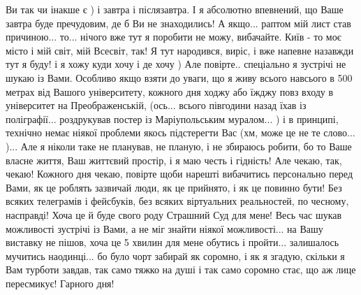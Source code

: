  
 
 
 
 

Ви так чи інакше є ) і завтра і післязавтра. І я абсолютно впевнений, що Ваше
завтра буде пречудовим, де б Ви не знаходились! А якщо... раптом мій лист став
причиною... то... нічого вже тут я поробити не можу, вибачайте. Київ - то моє
місто і мій світ, мій Всесвіт, так! Я тут народився, виріс, і вже напевне
назавжди тут я буду! і я хожу куди хочу і де хочу ) Але повірте.. спеціально я
зустрічі не шукаю із Вами. Особливо якщо взяти до уваги, що я живу всього
навсього в 500 метрах від Вашого університету, кожного дня ходжу або їжджу повз
входу в університет на Преображенській, (ось... всього півгодини назад їхав із
поліграфії... роздрукував постер із Маріупольським муралом... ) і в принципі,
технічно немає ніякої проблеми якось підстерегти Вас (хм, може це не те
слово... )... Але я ніколи таке не планував, не планую, і не збираюсь робити,
бо то Ваше власне життя, Ваш життєвий простір, і я маю честь і гідність!  Але
чекаю, так, чекаю! Кожного дня чекаю, повірте щоби нарешті вибачитись
персонально  перед Вами, як це роблять зазвичай люди, як це прийнято, і як це
повинно бути! Без всяких телеграмів і фейсбуків, без всяких віртуальних
реальностей, по чесному, насправді! Хоча це й буде свого роду Страшний Суд для
мене! Весь час шукав можливості зустрічі із Вами, а не міг знайти ніякої
можливості... на Вашу виставку не пішов, хоча це 5 хвилин для мене обутись і
пройти... залишалось мучитись наодинці... бо було чорт забирай як соромно, і як
я згадую, скільки я Вам турботи завдав, так само тяжко на душі і так само
соромно стає, що аж лице пересмикує! Гарного дня!

